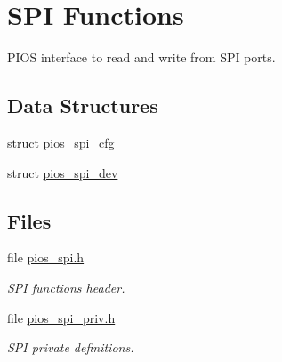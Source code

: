 \hypertarget{group___p_i_o_s___s_p_i}{\section{\-S\-P\-I \-Functions}
\label{group___p_i_o_s___s_p_i}
}


\-P\-I\-O\-S interface to read and write from \-S\-P\-I ports.  


\subsection*{\-Data \-Structures}
\begin{DoxyCompactItemize}
\item 
struct \hyperlink{structpios__spi__cfg}{pios\-\_\-spi\-\_\-cfg}
\item 
struct \hyperlink{structpios__spi__dev}{pios\-\_\-spi\-\_\-dev}
\end{DoxyCompactItemize}
\subsection*{\-Files}
\begin{DoxyCompactItemize}
\item 
file \hyperlink{pios__spi_8h}{pios\-\_\-spi.\-h}
\begin{DoxyCompactList}\small\item\em \-S\-P\-I functions header. \end{DoxyCompactList}\item 
file \hyperlink{pios__spi__priv_8h}{pios\-\_\-spi\-\_\-priv.\-h}
\begin{DoxyCompactList}\small\item\em \-S\-P\-I private definitions. \end{DoxyCompactList}\end{DoxyCompactItemize}
